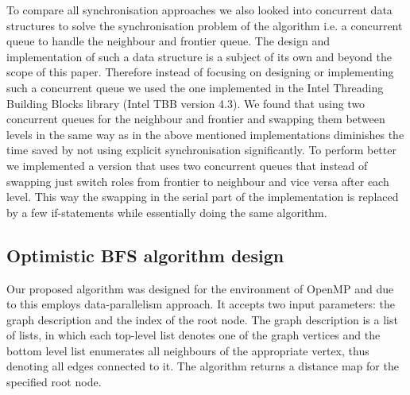 \documentclass[letterpaper]{article}
\begin{document}
		
		

		To compare all synchronisation approaches we also looked into concurrent data structures to solve the synchronisation problem of the algorithm i.e. a concurrent queue to handle the neighbour and frontier queue.
		The design and implementation of such a data structure is a subject of its own and beyond the scope of this paper. Therefore instead of focusing on designing or implementing such a concurrent queue we used the one implemented in the Intel Threading Building Blocks library (Intel TBB version 4.3).
		We found that using two concurrent queues for the neighbour and frontier and swapping them between levels in the same way as in the above mentioned implementations diminishes the time saved by not using explicit synchronisation significantly.
		To perform better we implemented a version that uses two concurrent queues that instead of swapping just switch roles from frontier to neighbour and vice versa after each level.
		This way the swapping in the serial part of the implementation is replaced by a few if-statements while essentially doing the same algorithm.
		 
		
			
		\subsection{Optimistic BFS algorithm design}
			Our proposed algorithm was designed for the environment of OpenMP and due to this employs data-parallelism approach. 
			It accepts two input parameters: the graph description and the index of the root node.
			The graph description is a list of lists, in which each top-level list denotes one of the graph vertices and the bottom level list enumerates all neighbours of the appropriate vertex, thus denoting all edges connected to it.
			The algorithm returns a distance map for the specified root node.
			
\end{document}
